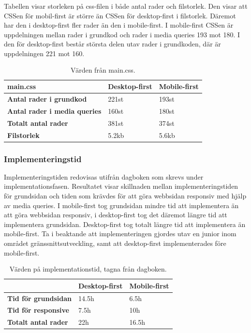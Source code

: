 \documentclass[11pt]{article}
\begin{document}
Tabellen visar storleken på css-filen i både antal rader och filstorlek. Den visar att CSSen för mobil-first är större än CSSen för desktop-first i filstorlek. Däremot har den i desktop-first fler rader än den i mobile-first. I mobile-first CSSen är uppdelningen mellan rader i grundkod och rader i media queries 193 mot 180. I den för desktop-first består största delen utav rader i grundkoden, där är uppdelningen 221 mot 160.

\begin{table}[H]
	\centering
	\begin{tabular}{|p{6cm}|p{2.7cm}|p{2.4cm}|}
	\hline
	\textbf{main.css}&\textbf{Desktop-first}&\textbf{Mobile-first}\\ \hline
	\textbf{Antal rader i grundkod}&221st&193st\\ \hline
	\textbf{Antal rader i media queries}&160st&180st\\ \hline
	\textbf{Totalt antal rader}&381st&374st\\ \hline
	\textbf{Filstorlek}&5.2kb&5.6kb\\ \hline
	\end{tabular}
    \caption {Värden från main.css.}
\end{table}

\subsubsection{Implementeringstid}

Implementeringstiden redovisas utifrån dagboken som skrevs under implementationsfasen. Resultatet visar skillnaden mellan implementeringstiden för grundsidan och tiden som krävdes för att göra webbsidan responsiv med hjälp av media queries. I mobile-first tog grundsidan mindre tid att implementera än att göra webbsidan responsiv, i desktop-first tog det däremot längre tid att implementera grundsidan. Desktop-first tog totalt längre tid att implementera än mobile-first. Ta i beaktande att implementeringen gjordes utav en junior inom området gränssnittsutveckling, samt att desktop-first implementerades före mobile-first.

\begin{table}[H]
	\centering
	\begin{tabular}{|p{6cm}|p{2.7cm}|p{2.4cm}|}
	\hline
	~&\textbf{Desktop-first}&\textbf{Mobile-first}\\ \hline
	\textbf{Tid för grundsidan}&14.5h&6.5h\\ \hline
	\textbf{Tid för responsive}&7.5h&10h\\ \hline
	\textbf{Totalt antal rader}&22h&16.5h\\ \hline
	\end{tabular}
    \caption {Värden på implementationstid, tagna från dagboken.}
\end{table}
\end{document}
